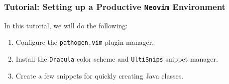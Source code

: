 \documentclass{beamer}
\begin{document}
\begin{frame}
    \frametitle{Tutorial: Setting up a Productive \texttt{Neovim} Environment}
    In this tutorial, we will do the following:
    \begin{enumerate}
        \item Configure the \texttt{pathogen.vim} plugin manager.
        \item Install the \texttt{Dracula} color scheme and \texttt{UltiSnips} snippet manager.
        \item Create a few snippets for quickly creating Java classes.
    \end{enumerate}
\end{frame}
\end{document}
